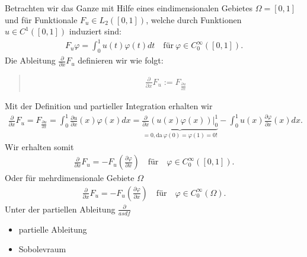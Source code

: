 \documentclass[letterpaper,10pt,english]{jupyterBook}
\begin{document}
Betrachten wir das Ganze mit Hilfe eines eindimensionalen Gebietes \(\Omega = [0,1]\) und für Funktionale \(F_u \in L_2([0,1])\), welche durch Funktionen \(u\in C^1([0,1])\) induziert sind:
\begin{equation*}
\begin{split}F_u \varphi = \int_0^1 u(t) \varphi(t) dt\quad \text{für}\ \varphi\in C_0^\infty([0,1]).\end{split}
\end{equation*}
Die Ableitung \(\frac{\partial}{\partial x} F_u\) definieren wir wie folgt:
\begin{quote}
\begin{equation*}
\begin{split}\frac{\partial}{\partial x} F_u := F_{\frac{\partial u}{\partial x}}\end{split}
\end{equation*}\end{quote}

Mit der Definition und partieller Integration erhalten wir
\begin{equation*}
\begin{split}\frac{\partial}{\partial x} F_u = F_{\frac{\partial u}{\partial x}} = \int_0^1 \frac{\partial u}{\partial x}(x) \varphi(x) dx = \underbrace{\frac{\partial}{\partial x} (u(x) \varphi(x)) \Big|_0^1}_{=0, \text{da}\ \varphi(0)=\varphi(1) = 0!} - \int_0^1 u(x) \frac{\partial \varphi}{\partial x}(x) dx.\end{split}
\end{equation*}
Wir erhalten somit
\begin{equation*}
\begin{split}\frac{\partial}{\partial x} F_u = - F_u (\frac{\partial \varphi}{\partial x})\quad\text{für}\quad \varphi \in C_0^\infty([0,1]).\end{split}
\end{equation*}
Oder für mehrdimensionale Gebiete \(\Omega\)
\begin{equation*}
\begin{split}\frac{\partial}{\partial x} F_u = - F_u (\frac{\partial \varphi}{\partial x})\quad\text{für}\quad \varphi \in C_0^\infty(\Omega).\end{split}
\end{equation*}
Unter der partiellen Ableitung \(\frac{\partial}{asdf}\)
\begin{itemize}
\item {} 
partielle Ableitung

\item {} 
Sobolevraum

\end{itemize}
\end{document}

